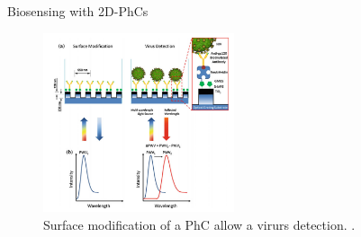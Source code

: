 \begin{frame}{Biosensing with 2D-PhCs}
  \begin{figure}
    \centering
    \includegraphics[width=0.5\textwidth]{./bilder/reflektion.png}
    \caption{Surface modification of a PhC allow a virurs detection. \cite{nano}.}
    \label{fig: virus detection}
  \end{figure}

\end{frame}

\begin{frame}
  \nocite{*}
  \printbibliography
\end{frame}

